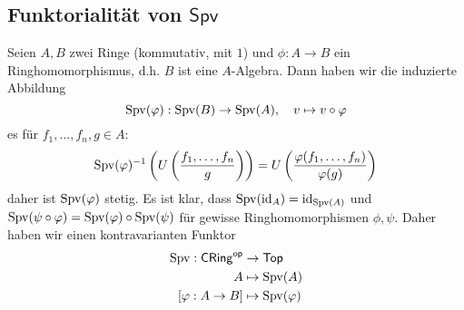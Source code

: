 \newpage
\subsection*{Funktorialität von $\mathsf{Spv}$}
Seien $A,B$ zwei Ringe (kommutativ, mit $1$) und $\phi:A\to B$ ein Ringhomomorphismus, d.h. $B$ ist eine $A$-Algebra. 
Dann haben wir die induzierte Abbildung 
\[
\operatorname{Spv}(\varphi):\operatorname{Spv}(B) \to \operatorname{Spv}(A), \quad v \mapsto v\circ \varphi    
\]
es für $f_1,\ldots,f_n,g\in A$:
\[
\operatorname{Spv}(\varphi)^{-1}\left(U\left(\frac{f_1,\ldots,f_n}{g}\right)\right) = U\left(\frac{\varphi(f_1,\ldots,f_n)}{\varphi(g)}\right)    
\]
daher ist $\operatorname{Spv}(\varphi)$ stetig. Es ist klar, dass $\operatorname{Spv}(\operatorname{id}_A) = \operatorname{id}_{\operatorname{Spv}(A)}$ und $\operatorname{Spv}(\psi\circ \varphi) = \operatorname{Spv}(\varphi) \circ \operatorname{Spv}(\psi)$ für gewisse Ringhomomorphismen $\phi,\psi$. 
Daher haben wir einen kontravarianten Funktor 
\begin{align*}
    \operatorname{Spv} : \mathsf{CRing}^{\mathsf{op}} &\to \mathsf{Top}    \\
    A &\mapsto \Spv{A} \\
    [\phi:A\to B] &\mapsto \Spv{\phi}    
\end{align*}
